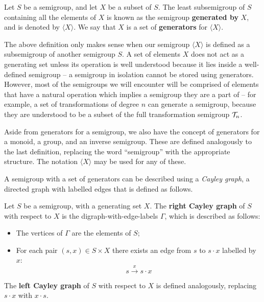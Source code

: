 \begin{definition}
  \label{def:generator}
  Let $S$ be a semigroup, and let $X$ be a subset of $S$.  The least
  subsemigroup of $S$ containing all the elements of $X$ is known as the
  semigroup \textbf{generated by} $X$, and is denoted by $\langle X \rangle$.
  We say that $X$ is a set of \textbf{generators} for $\langle X \rangle$.
\end{definition}

The above definition only makes sense when our semigroup $\langle X \rangle$ is
defined as a subsemigroup of another semigroup $S$.  A set of elements $X$ does
not act as a generating set unless its operation is well understood because it
lies inside a well-defined semigroup -- a semigroup in isolation cannot be
stored using generators.  However, most of the semigroups we will encounter will
be comprised of elements that have a natural operation which implies a semigroup
they are a part of -- for example, a set of transformations of degree $n$ can
generate a semigroup, because they are understood to be a subset of the full
transformation semigroup $\mathcal{T}_n$.

Aside from generators for a semigroup, we also have the concept of generators
for a monoid, a group, and an inverse semigroup.  These are defined analogously
to the last definition, replacing the word ``semigroup'' with the appropriate
structure.  The notation $\langle X \rangle$ may be used for any of these.

A semigroup with a set of generators can be described using a \textit{Cayley
  graph}, a directed graph with labelled edges that is defined as follows.

\begin{definition}
  \label{def:cayley-graph}
  Let $S$ be a semigroup, with a generating set $X$.  The \textbf{right Cayley
    graph} of $S$ with respect to $X$ is the digraph-with-edge-labels $\Gamma$,
  which is described as follows:
  \begin{itemize}
  \item The vertices of $\Gamma$ are the elements of $S$;
  \item For each pair $(s, x) \in S \times X$ there exists an edge from $s$ to
    $s \cdot x$ labelled by $x$:
    $$s \overset{x}{\longrightarrow} s \cdot x$$
  \end{itemize}
  The \textbf{left Cayley graph} of $S$ with respect to $X$ is defined
  analogously, replacing $s \cdot x$ with $x \cdot s$.
\end{definition}

